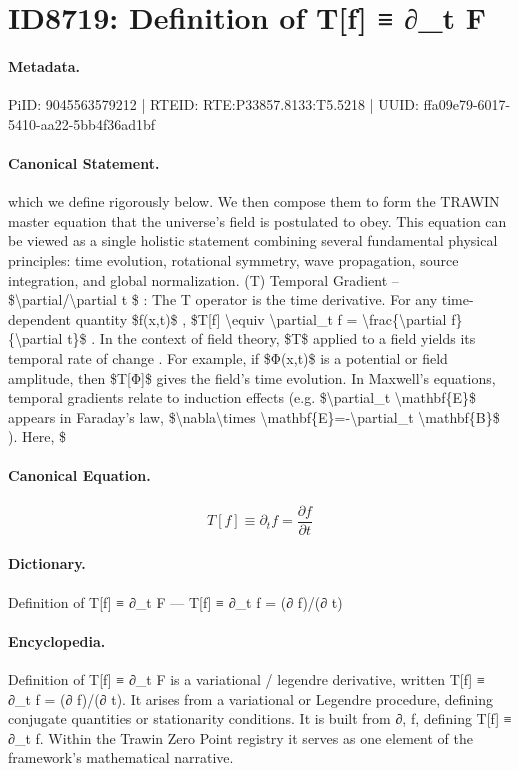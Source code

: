 \section*{ID8719: Definition of T[f] ≡ ∂\_t F}
\paragraph{Metadata.}
PiID: 9045563579212 | RTEID: RTE:P33857.8133:T5.5218 | UUID: ffa09e79-6017-5410-aa22-5bb4f36ad1bf

\paragraph{Canonical Statement.}
which we define rigorously below. We then compose them to form the TRAWIN master equation that the universe’s field is postulated to obey. This equation can be viewed as a single holistic statement combining several fundamental physical principles: time evolution, rotational symmetry, wave propagation, source integration, and global normalization. (T) Temporal Gradient – \$\textbackslash{}partial/\textbackslash{}partial t \$ : The T operator is the time derivative. For any time-dependent quantity \$f(x,t)\$ , \$T[f] \textbackslash{}equiv \textbackslash{}partial\_t f = \textbackslash{}frac\{\textbackslash{}partial f\}\{\textbackslash{}partial t\}\$ . In the context of field theory, \$T\$ applied to a field yields its temporal rate of change . For example, if \$Φ(x,t)\$ is a potential or field amplitude, then \$T[Φ]\$ gives the field’s time evolution. In Maxwell’s equations, temporal gradients relate to induction effects (e.g. \$\textbackslash{}partial\_t \textbackslash{}mathbf\{E\}\$ appears in Faraday’s law, \$\textbackslash{}nabla\textbackslash{}times \textbackslash{}mathbf\{E\}=-\textbackslash{}partial\_t \textbackslash{}mathbf\{B\}\$ ). Here, \$

\paragraph{Canonical Equation.}
\[
T[f] \equiv \partial_t f = \frac{\partial f}{\partial t}
\]

\paragraph{Dictionary.}
Definition of T[f] ≡ ∂\_t F — T[f] ≡ ∂\_t f = (∂ f)/(∂ t)

\paragraph{Encyclopedia.}
Definition of T[f] ≡ ∂\_t F is a variational / legendre derivative, written T[f] ≡ ∂\_t f = (∂ f)/(∂ t). It arises from a variational or Legendre procedure, defining conjugate quantities or stationarity conditions. It is built from ∂, f, defining T[f] ≡ ∂\_t f. Within the Trawin Zero Point registry it serves as one element of the framework's mathematical narrative.
